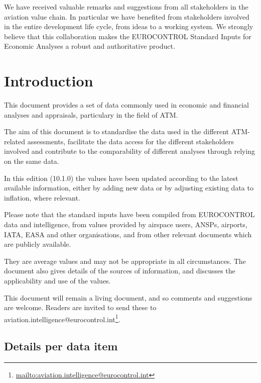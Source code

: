 \documentclass[
  11pt,
  a4paper,
]{book}
\DeclareRobustCommand{\href}[2]{#2\footnote{\url{#1}}}
\begin{document}
We have received valuable remarks and suggestions from all stakeholders
in the aviation value chain. In particular we have benefited from
stakeholders involved in the entire development life cycle, from ideas
to a working system. We strongly believe that this collaboration makes
the EUROCONTROL Standard Inputs for Economic Analyses a robust and
authoritative product.


\hypertarget{introduction}{%
\chapter*{Introduction}\label{introduction}}


This document provides a set of data commonly used in economic and
financial analyses and appraisals, particulary in the field of ATM.

The aim of this document is to standardise the data used in the
different ATM-related assessments, facilitate the data access for the
different stakeholders involved and contribute to the comparability of
different analyses through relying on the same data.

In this edition (10.1.0) the values have been updated according to the
latest available information, either by adding new data or by adjusting
existing data to inflation, where relevant.

Please note that the standard inputs have been compiled from EUROCONTROL
data and intelligence, from values provided by airspace users, ANSPs,
airports, IATA, EASA and other organisations, and from other relevant
documents which are publicly available.

They are average values and may not be appropriate in all circumstances.
The document also gives details of the sources of information, and
discusses the applicability and use of the values.

This document will remain a living document, and so comments and
suggestions are welcome. Readers are invited to send these to
\href{mailto:aviation.intelligence@eurocontrol.int}{aviation.intelligence@eurocontrol.int}.

\hypertarget{details-per-data-item}{%
\section*{Details per data item}\label{details-per-data-item}}
\end{document}

